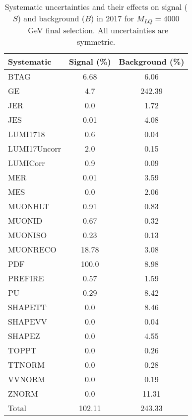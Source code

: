 \begin{table}[htbp]
\begin{center}
\caption{Systematic uncertainties and their effects on signal ($S$) and background ($B$) in 2017 for $M_{LQ}=4000$~GeV final selection. All uncertainties are symmetric.}
\begin{tabular}{lcc}
\hline\hline
Systematic & Signal (\%) & Background (\%) \\ \hline 
BTAG & 6.68 & 6.06\\ 
GE & 4.7 & 242.39\\ 
JER & 0.0 & 1.72\\ 
JES & 0.01 & 4.08\\ 
LUMI1718 & 0.6 & 0.04\\ 
LUMI17Uncorr & 2.0 & 0.15\\ 
LUMICorr & 0.9 & 0.09\\ 
MER & 0.01 & 3.59\\ 
MES & 0.0 & 2.06\\ 
MUONHLT & 0.91 & 0.83\\ 
MUONID & 0.67 & 0.32\\ 
MUONISO & 0.23 & 0.13\\ 
MUONRECO & 18.78 & 3.08\\ 
PDF & 100.0 & 8.98\\ 
PREFIRE & 0.57 & 1.59\\ 
PU & 0.29 & 8.42\\ 
SHAPETT & 0.0 & 8.46\\ 
SHAPEVV & 0.0 & 0.04\\ 
SHAPEZ & 0.0 & 4.55\\ 
TOPPT & 0.0 & 0.26\\ 
TTNORM & 0.0 & 0.28\\ 
VVNORM & 0.0 & 0.19\\ 
ZNORM & 0.0 & 11.31\\ 
Total & 102.11 & 243.33\\ \hline \hline
\end{tabular}
\label{tab:SysUncertainties_uujj_4000}
\end{center}
\end{table}

